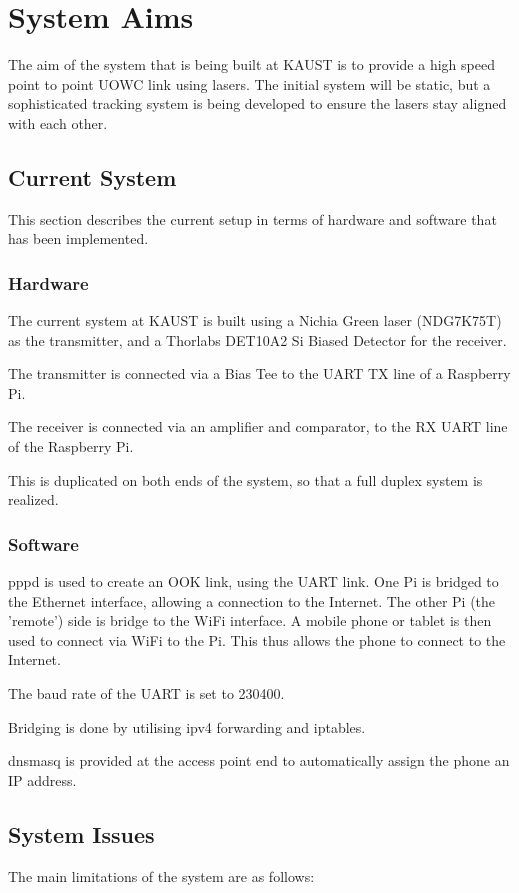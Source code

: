 \section{System Aims}
The aim of the system that is being built at \ac{KAUST} is to provide a high
speed point to point \ac{UOWC} link using lasers. The initial system will be
static, but a sophisticated tracking system is being developed to ensure the
lasers stay aligned with each other.

\subsection{Current System}
This section describes the current setup in terms of hardware and software
that has been implemented.

\subsubsection{Hardware}
The current system at \ac{KAUST} is built using a Nichia Green laser (NDG7K75T)
as the transmitter, and a Thorlabs DET10A2 Si Biased Detector for the receiver.

The transmitter is connected via a Bias Tee  to
the \ac{UART} TX line of a Raspberry Pi.

The receiver is connected via an amplifier and comparator, to the RX UART
line of the Raspberry Pi.

This is duplicated on both ends of the system, so that a full duplex
system is realized.

\subsubsection{Software}
pppd is used to create an OOK link, using the \ac{UART} link. One Pi is
bridged to the Ethernet interface, allowing a connection to the Internet.
The other Pi (the 'remote') side is bridge to the WiFi interface. A mobile
phone or tablet is then used to connect via WiFi to the Pi. This thus allows
the phone to connect to the Internet.

The baud rate of the \ac{UART} is set to 230400.

Bridging is done by utilising ipv4 forwarding and iptables.

dnsmasq is provided at the access point end to automatically assign the phone
an IP address.

\subsection{System Issues}
The main limitations of the system are as follows:

